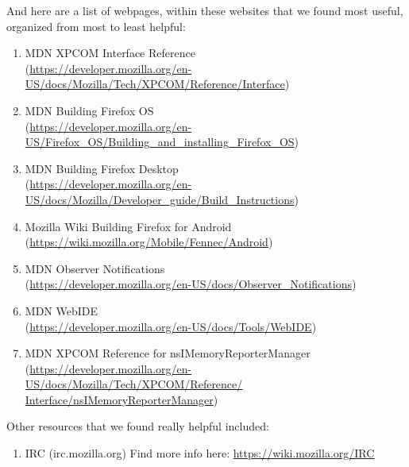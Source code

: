 \documentclass[12pt]{article}
\begin{document}
And here are a list of webpages, within these websites that we found most useful, organized from most to least helpful:
\begin{enumerate}
	\item MDN XPCOM Interface Reference\\ (\href{https://developer.mozilla.org/en-US/docs/Mozilla/Tech/XPCOM/Reference/Interface}{https://developer.mozilla.org/en-US/docs/Mozilla/Tech/XPCOM/Reference/Interface})
	\item MDN Building Firefox OS\\ (\href{https://developer.mozilla.org/en-US/Firefox\_OS/Building\_and\_installing\_Firefox\_OS}{https://developer.mozilla.org/en-US/Firefox\_OS/Building\_and\_installing\_Firefox\_OS})
	\item MDN Building Firefox Desktop \\(\href{https://developer.mozilla.org/en-US/docs/Mozilla/Developer\_guide/Build\_Instructions}{https://developer.mozilla.org/en-US/docs/Mozilla/Developer\_guide/Build\_Instructions})
	\item Mozilla Wiki Building Firefox for Android \\ (\href{https://wiki.mozilla.org/Mobile/Fennec/Android}{https://wiki.mozilla.org/Mobile/Fennec/Android})
	\item MDN Observer Notifications \\ (\href{https://developer.mozilla.org/en-US/docs/Observer\_Notifications}{https://developer.mozilla.org/en-US/docs/Observer\_Notifications})
	\item MDN WebIDE \\(\href{https://developer.mozilla.org/en-US/docs/Tools/WebIDE}{https://developer.mozilla.org/en-US/docs/Tools/WebIDE})
	\item MDN XPCOM Reference for nsIMemoryReporterManager \\ (\href{https://developer.mozilla.org/en-US/docs/Mozilla/Tech/XPCOM/Reference/Interface/nsIMemoryReporterManager}{https://developer.mozilla.org/en-US/docs/Mozilla/Tech/XPCOM/Reference/\\Interface/nsIMemoryReporterManager})
\end{enumerate}

\noindent Other resources that we found really helpful included:
\begin{enumerate}
	\item IRC (irc.mozilla.org)
		\subitem Find more info here: \href{https://wiki.mozilla.org/IRC}{https://wiki.mozilla.org/IRC}
\end{enumerate}
\pagebreak
\end{document}
